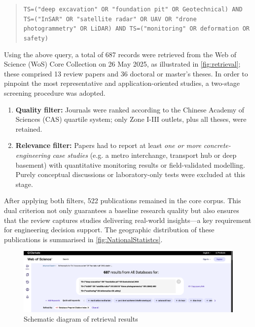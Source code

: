 \documentclass[preprint,11pt,authoryear,3p]{elsarticle}
\begin{document}
\begin{quote}
\texttt{TS=("deep excavation" OR "foundation pit" OR Geotechnical) AND
TS=("InSAR" OR "satellite radar" OR UAV OR "drone photogrammetry" OR LiDAR) AND
TS=("monitoring" OR deformation OR safety)}
\end{quote}

Using the above query, a total of 687 records were retrieved from the Web of Science (WoS) Core Collection on 26 May 2025, as illustrated in \autoref{fig:retrieval}; these comprised 13 review papers and 36 doctoral or master's theses.  In order to pinpoint the most representative and application-oriented studies, a two-stage screening procedure was adopted.

\begin{enumerate}
    \item \textbf{Quality filter:} Journals were ranked according to the Chinese Academy of Sciences (CAS) quartile system; only Zone I-III outlets, plus all theses, were retained.
    \item \textbf{Relevance filter:} Papers had to report at least \emph{one or more concrete-engineering case studies} (e.g. a metro interchange, transport hub or deep basement) with quantitative monitoring results or field-validated modelling. Purely conceptual discussions or laboratory-only tests were excluded at this stage.
\end{enumerate}

After applying both filters, 522 publications remained in the core corpus. This dual criterion not only guarantees a baseline research quality but also ensures that the review captures studies delivering real-world insights—a key
requirement for engineering decision support. The geographic distribution of these publications is summarised in \autoref{fig:NationalStatistcs}.

\begin{figure}[htbp]
    \centering
    \includegraphics[width=\textwidth]{imgs/advanceSearch.png}
    \caption{Schematic diagram of retrieval results}
    \label{fig:retrieval}
\end{figure}
\end{document}
